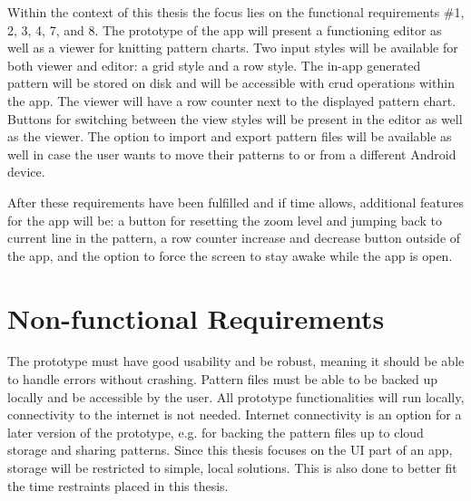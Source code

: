 Within the context of this thesis the focus lies on the functional requirements \#1, 2, 3, 4, 7, and 8. The prototype of the app will present a functioning editor as well as a viewer for knitting pattern charts. Two input styles will be available for both viewer and editor: a grid style and a row style. The in-app generated pattern will be stored on disk and will be accessible with \gls{crud} operations within the app. The viewer will have a row counter next to the displayed pattern chart. Buttons for switching between the view styles will be present in the editor as well as the viewer. The option to import and export pattern files will be available as well in case the user wants to move their patterns to or from a different Android device. 

After these requirements have been fulfilled and if time allows, additional features for the app will be: a button for resetting the zoom level and jumping back to current line in the pattern, a row counter increase and decrease button outside of the app, and the option to force the screen to stay awake while the app is open.

\section{Non-functional Requirements}

The prototype must have good usability and be robust, meaning it should be able to handle errors without crashing. Pattern files must be able to be backed up locally and be accessible by the user. All prototype functionalities will run locally, connectivity to the internet is not needed. Internet connectivity is an option for a later version of the prototype, e.g. for backing the pattern files up to cloud storage and sharing patterns. Since this thesis focuses on the \gls{UI} part of an app, storage will be restricted to simple, local solutions. This is also done to better fit the time restraints placed in this thesis. 